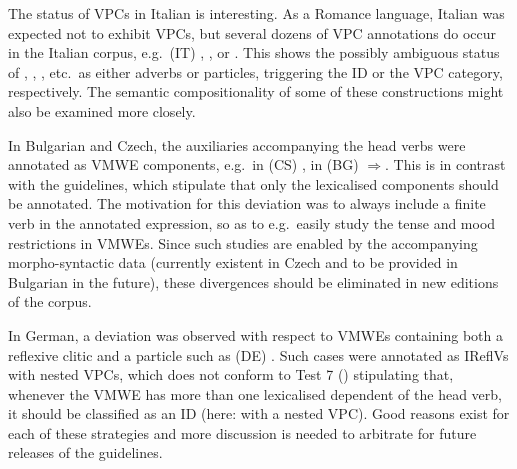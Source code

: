 \documentclass[output=paper,
modfonts,
]{langscibook}
\begin{document}


The status of VPCs in Italian is interesting. As a Romance language, Italian was expected not to exhibit VPCs, but several dozens of VPC annotations do occur in the Italian corpus, e.g.\ (IT) , %
, 
or . This shows the possibly ambiguous status of , , , etc.\ as either adverbs or particles, triggering the ID or the VPC category, respectively. The semantic compositionality of some of these constructions might also be examined more closely.

In Bulgarian and Czech, the auxiliaries accompanying the head verbs were annotated as VMWE components, e.g.\ in (CS) , in (BG) %
 $\Rightarrow$. This is in contrast with the guidelines, which stipulate that only the lexicalised components should be annotated. %
The motivation for this deviation was to always include a finite verb in the annotated expression, so as to e.g.\ easily study the tense and mood restrictions in VMWEs. Since such studies are enabled by the accompanying morpho-syntactic data (currently existent in Czech and to be provided in Bulgarian in the future), these divergences should be eliminated in new editions of the corpus. 

In German, a deviation was observed with respect to VMWEs containing both a reflexive clitic and a particle such as  (DE) . Such cases were annotated as IReflVs with nested VPCs, which does not conform to Test 7 () stipulating that, whenever the VMWE has more than one lexicalised dependent of the head verb, it should be classified as an ID (here: with a nested VPC).  Good reasons exist for each of these strategies and more discussion is needed to arbitrate for future releases of the guidelines.
\end{document}
